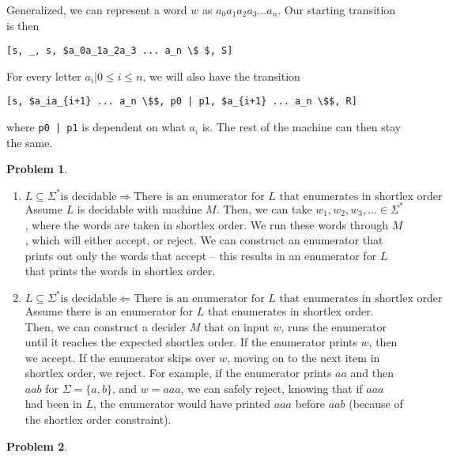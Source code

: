 \documentclass[11pt]{article}
\theoremstyle{definition}
\theoremstyle{case}
\theoremstyle{theorem}
\newtheorem{prob}{Problem}
\begin{document}
Generalized, we can represent a word $w$ as $a_0a_1a_2a_3 ... a_n$. Our starting 
transition is then 
\begin{lstlisting}
[s, _, s, $a_0a_1a_2a_3 ... a_n \$ $, S]
\end{lstlisting}
For every letter $a_i | 0 \leq i \leq n$, we will also have the transition 
\begin{lstlisting}
[s, $a_ia_{i+1} ... a_n \$$, p0 | p1, $a_{i+1} ... a_n \$$, R]
\end{lstlisting}
where \texttt{p0 | p1} is dependent on what $a_i$ is. The rest of the machine can then stay the same.

\newpage

\begin{prob}\end{prob}

\begin{enumerate}[label=(\alph*)]

\item $L \subseteq \Sigma^* \text{is decidable} \Rightarrow \text{There is an enumerator for } L \text{ that enumerates in shortlex order}$ \\
Assume $L$ is decidable with machine $M$. Then, we can take $w_1, w_2, w_3, ... \in \Sigma^*$, where
the words are taken in shortlex order. We run these words through $M$, which will either accept,
or reject. We can construct an enumerator that prints out only the words that accept -- this
results in an enumerator for $L$ that prints the words in shortlex order.

\item $L \subseteq \Sigma^* \text{is decidable} \Leftarrow \text{There is an enumerator for } L \text{ that enumerates in shortlex order}$ \\
Assume there is an enumerator for $L$ that enumerates in shortlex order. Then, we can construct
a decider $M$ that on input $w$, runs the enumerator until it reaches the expected shortlex order.
If the enumerator prints $w$, then we accept. If the enumerator skips over $w$, moving on to the next
item in shortlex order, we reject. For example, if the enumerator prints $aa$ and then $aab$ for $\Sigma = \{a, b\}$,
and $w = aaa$, we can safely reject, knowing that if $aaa$ had been in $L$, the enumerator would have
printed $aaa$ before $aab$ (because of the shortlex order constraint).

\end{enumerate}

\begin{prob}\end{prob}
\end{document}

